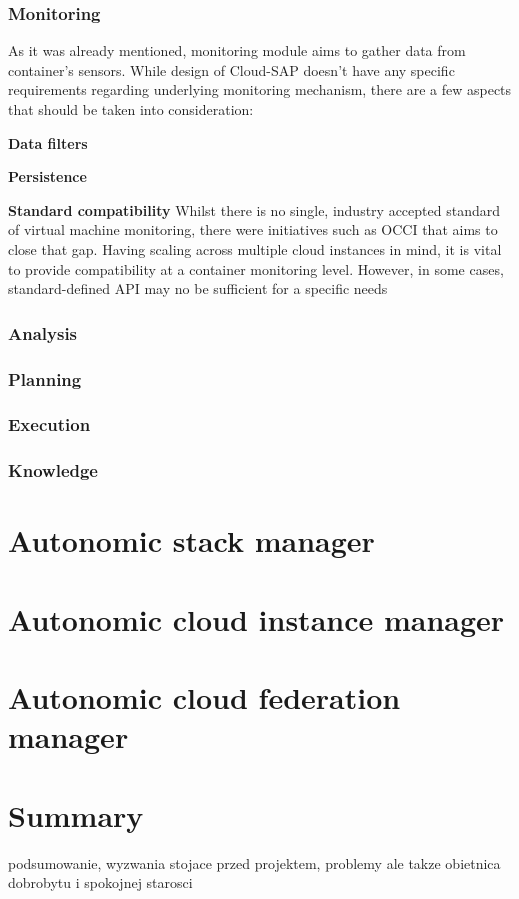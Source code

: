 \subsubsection{Monitoring}
As it was already mentioned, monitoring module aims to gather data from container's sensors. While design of Cloud-SAP doesn't have any specific requirements regarding underlying monitoring mechanism, there are a few aspects that should be taken into consideration:
\begin{asparaenum}
  \item[\textbf{Data filters}]

  \item[\textbf{Persistence}]

  \item[\textbf{Standard compatibility}] Whilst there is no single, industry accepted standard of virtual machine monitoring, there were initiatives such as OCCI \cite{OCCI} that aims to close that gap. Having scaling across multiple cloud instances in mind, it is vital to provide compatibility at a container monitoring level. However, in some cases, standard-defined API may no be sufficient for a specific needs  
\end{asparaenum}


\subsubsection{Analysis}
\subsubsection{Planning}
\subsubsection{Execution}
\subsubsection{Knowledge}

\section{Autonomic stack manager}

\section{Autonomic cloud instance manager}

\section{Autonomic cloud federation manager}

\section{Summary}
podsumowanie, wyzwania stojace przed projektem, problemy ale takze obietnica dobrobytu i spokojnej starosci



